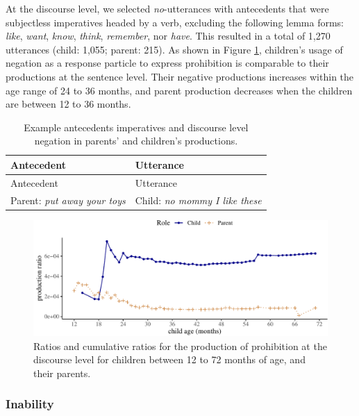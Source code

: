 \documentclass[
  english,
  man,floatsintext]{apa6}
\begin{document}
At the discourse level, we selected \emph{no}-utterances with antecedents that were subjectless imperatives headed by a verb, excluding the following lemma forms: \emph{like}, \emph{want}, \emph{know}, \emph{think}, \emph{remember}, nor \emph{have}. This resulted in a total of 1,270 utterances (child: 1,055; parent: 215). As shown in Figure \ref{fig:prohibitiondiscourse}, children's usage of negation as a response particle to express prohibition is comparable to their productions at the sentence level. Their negative productions increases within the age range of 24 to 36 months, and parent production decreases when the children are between 12 to 36 months.

\begin{longtable}[]{@{}ll@{}}
\caption{\label{tab:disprohib} Example antecedents imperatives and discourse level negation in parents' and children's productions.}\tabularnewline
\toprule
Antecedent & Utterance \\
\midrule
\endfirsthead
\toprule
Antecedent & Utterance \\
\midrule
\endhead
Parent: \emph{put away your toys} & Child: \emph{no mommy I like these} \\
\bottomrule
\end{longtable}

\begin{figure}[H]

{\centering \includegraphics{neg_construction_article_files/figure-latex/prohibitiondiscourse-1} 

}

\caption{Ratios and cumulative ratios for the production of prohibition at the discourse level for children between 12 to 72 months of age, and their parents.}\label{fig:prohibitiondiscourse}
\end{figure}

\hypertarget{inability}{%
\subsubsection{Inability}\label{inability}}
\end{document}
